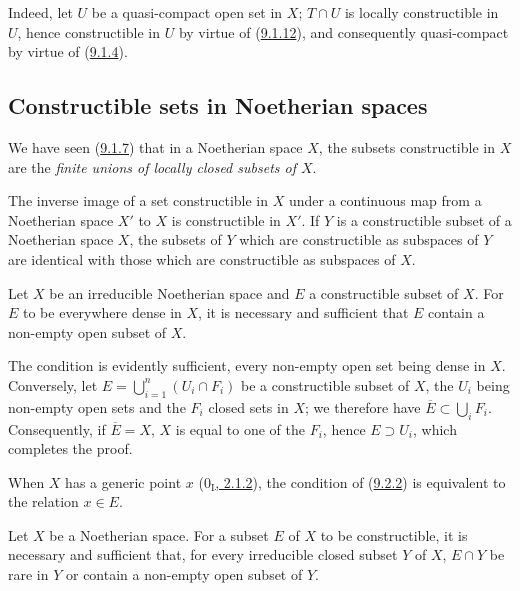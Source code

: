 Indeed, let $U$ be a quasi-compact open set in $X$; $T\cap U$ is
locally constructible in $U$, hence constructible in $U$ by virtue of
(\hyperref[0.9.1.12]{9.1.12}), and consequently quasi-compact by virtue of
(\hyperref[0.9.1.4]{9.1.4}).

\subsection{Constructible sets in Noetherian spaces}
\label{subsection:0.9.2}

\begin{env}[9.2.1]
\label{0.9.2.1}
We have seen (\hyperref[0.9.1.7]{9.1.7}) that in a Noetherian space $X$, the
subsets constructible in $X$ are the \emph{finite unions of locally
closed subsets of $X$}.

The inverse image of a set constructible in $X$ under a continuous
map from a Noetherian space $X'$ to $X$ is constructible in $X'$.
If $Y$ is a constructible subset of a Noetherian space $X$, the subsets
of $Y$ which are constructible as subspaces of $Y$ are
identical with those which are constructible as subspaces of $X$.
\end{env}

\begin{proposition}[9.2.2]
\label{0.9.2.2}
Let $X$ be an irreducible Noetherian space and $E$ a constructible subset of
$X$. For $E$ to be everywhere dense in $X$, it is necessary and sufficient
that $E$ contain a non-empty open subset of $X$.
\end{proposition}

The condition is evidently sufficient, every non-empty open set being
dense in $X$. Conversely, let
$E=\bigcup_{i=1}^n(U_i\cap F_i)$ be a constructible subset of $X$, the $U_i$
being non-empty open sets and the $F_i$ closed sets in $X$; we therefore have
$\overline{E}\subset\bigcup_i F_i$. Consequently, if $\overline{E}=X$, $X$ is
equal to one of the $F_i$, hence $E\supset U_i$, which completes the proof.

When $X$ has a generic point $x$
(\hyperref[0.2.1.2]{$0_{\mathrm I}$, 2.1.2}), the condition of
(\hyperref[0.9.2.2]{9.2.2}) is equivalent to the relation $x\in E$.

\begin{proposition}[9.2.3]
\label{0.9.2.3}
Let $X$ be a Noetherian space. For a subset $E$ of $X$ to be
constructible, it is necessary and sufficient that, for every irreducible
closed subset $Y$ of $X$, $E\cap Y$ be rare in $Y$ or contain a
non-empty open subset of $Y$.
\end{proposition}

